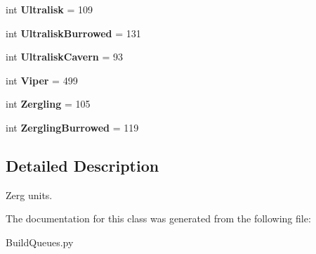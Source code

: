 \begin{DoxyCompactItemize}
\item 
int {\bfseries Ultralisk} = 109\hypertarget{classBuildQueues_1_1Zerg_a398bfeb70452e03d85615f33d6e61809}{}\label{classBuildQueues_1_1Zerg_a398bfeb70452e03d85615f33d6e61809}

\item 
int {\bfseries Ultralisk\+Burrowed} = 131\hypertarget{classBuildQueues_1_1Zerg_ad8d935184dfef47aa587795bfdcf5824}{}\label{classBuildQueues_1_1Zerg_ad8d935184dfef47aa587795bfdcf5824}

\item 
int {\bfseries Ultralisk\+Cavern} = 93\hypertarget{classBuildQueues_1_1Zerg_a28bcd588b8754b4a04bd504b38e055ad}{}\label{classBuildQueues_1_1Zerg_a28bcd588b8754b4a04bd504b38e055ad}

\item 
int {\bfseries Viper} = 499\hypertarget{classBuildQueues_1_1Zerg_aa3b9419d74a1a0a31cecf35b58b5ed98}{}\label{classBuildQueues_1_1Zerg_aa3b9419d74a1a0a31cecf35b58b5ed98}

\item 
int {\bfseries Zergling} = 105\hypertarget{classBuildQueues_1_1Zerg_a12ae725fdc4a6b1a66a01de073ef6206}{}\label{classBuildQueues_1_1Zerg_a12ae725fdc4a6b1a66a01de073ef6206}

\item 
int {\bfseries Zergling\+Burrowed} = 119\hypertarget{classBuildQueues_1_1Zerg_a19bfb1f5a25d6492cc95118134cd904d}{}\label{classBuildQueues_1_1Zerg_a19bfb1f5a25d6492cc95118134cd904d}

\end{DoxyCompactItemize}


\subsection{Detailed Description}
\begin{DoxyVerb}Zerg units.\end{DoxyVerb}
 

The documentation for this class was generated from the following file\+:\begin{DoxyCompactItemize}
\item 
Build\+Queues.\+py\end{DoxyCompactItemize}
